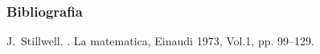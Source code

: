 \begin{frame}
    \frametitle{Bibliografia}
    \begin{thebibliography}
        J.~Stillwell.
        .
        \newblock La matematica, Einaudi 1973, Vol.1, pp. 99--129.

    \end{thebibliography}
\end{frame}